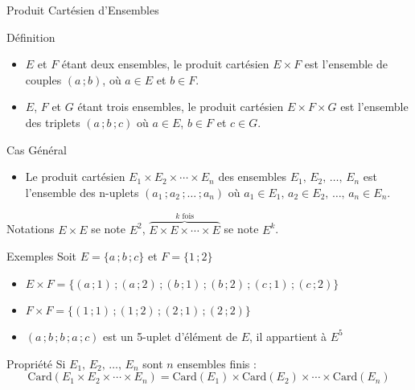 \documentclass{cours}
\begin{document}
    \begin{Gpartie}{Produit Cartésien d'Ensembles}
        \begin{Spartie}{Définition}
            \begin{itemize}
                \item $E$ et $F$ étant deux ensembles, le produit cartésien $E\times F$ est l'ensemble de couples $(a\,;b)$, où $a\in E$ et $b\in F$.
                \item $E$, $F$ et $G$ étant trois ensembles, le produit cartésien $E\times F\times G$ est l'ensemble des triplets $(a\,;b\,;c)$ où $a\in E$, $b\in F$ et $c\in G$.
            \end{itemize}
            \begin{SSpartie}{Cas Général}
                \begin{itemize}
                    \item Le produit cartésien $E_1\times E_2\times\dotsb\times E_n$ des ensembles $E_1,\,E_2,\,\dotsc,\,E_n$ est l'ensemble des n-uplets $(a_1\,;a_2\,;\dotsc\,;a_n)$ où $a_1\in E_1,\,a_2\in E_2,\,\dotsc,\,a_n\in E_n$.
                \end{itemize}
            \end{SSpartie}
        \end{Spartie}
        \begin{Spartie}{Notations}
            $E\times E$ se note $E^2$, $\overbrace{E\times E\times\dotsb\times E}^\text{$k$ fois}$ se note $E^k$.
        \end{Spartie}
        \begin{Spartie}{Exemples}
            Soit $E=\big\{a\,;b\,;c\big\}$ et $F=\big\{1\,;2\big\}$
            \begin{itemize}
                \item $E\times F=\big\{(a\,;1)\,;(a\,;2)\,;(b\,;1)\,;(b\,;2)\,;(c\,;1)\,;(c\,;2)\big\}$
                \item $F\times F=\big\{(1\,;1)\,;(1\,;2)\,;(2\,;1)\,;(2\,;2)\big\}$
                \item $(a\,;b\,;b\,;a\,;c)$ est un 5-uplet d'élément de $E$, il appartient à $E^5$
            \end{itemize}
        \end{Spartie}
        \begin{Spartie}{Propriété}
            Si $E_1,\,E_2,\,\dotsc,\,E_n$ sont $n$ ensembles finis :
            \[\text{Card}(E_1\times E_2\times\dotsb\times E_n)=\text{Card}(E_1)\times\text{Card}(E_2)\times\dotsb\times\text{Card}(E_n)\]

\end{Spartie}
\end{Gpartie}
\end{document}
